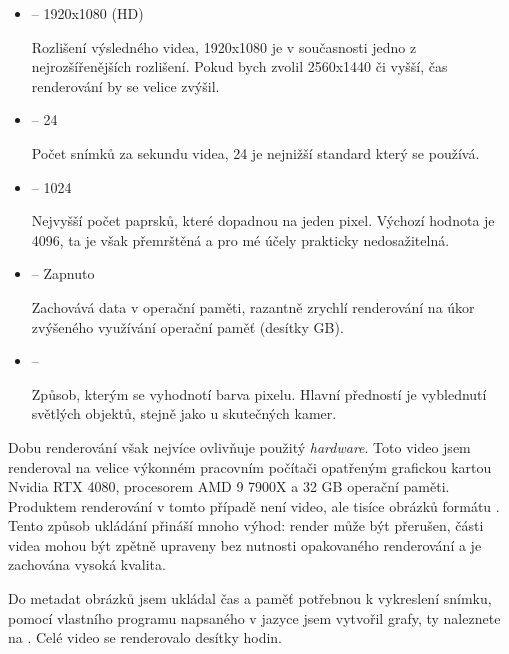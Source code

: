 \begin{itemize}
    \item { -- 1920x1080 (HD)}\par
        {Rozlišení výsledného videa, 1920x1080 je v současnosti jedno z nejrozšířenějších rozlišení. Pokud bych zvolil 2560x1440 či vyšší, čas renderování by se velice zvýšil.}
    \item { -- 24}\par
        {Počet snímků za sekundu videa, 24 je nejnižší standard který se používá.}
    \item { -- 1024}\par
        {Nejvyšší počet paprsků, které dopadnou na jeden pixel. Výchozí hodnota je 4096, ta je však přemrštěná a pro mé účely prakticky nedosažitelná.}
    \item { -- Zapnuto}\par
        {Zachovává data v operační paměti, razantně zrychlí renderování na úkor zvýšeného využívání operační paměť (desítky GB).}
    \item { -- }\par
        {Způsob, kterým se vyhodnotí barva pixelu. Hlavní předností  je vyblednutí světlých objektů, stejně jako u skutečných kamer.}
\end{itemize}

{Dobu renderování však nejvíce ovlivňuje použitý \textit{hardware}. Toto video jsem renderoval na velice výkonném pracovním počítači opatřeným grafickou kartou Nvidia RTX 4080, procesorem AMD 9 7900X a 32 GB operační paměti.}\odst
{Produktem renderování v tomto případě není video, ale tisíce obrázků formátu . Tento způsob ukládání přináší mnoho výhod: render může být přerušen, části videa mohou být zpětně upraveny bez nutnosti opakovaného renderování a je zachována vysoká kvalita.}

\newpage

{Do metadat obrázků jsem ukládal čas a paměť potřebnou k vykreslení snímku, pomocí vlastního programu napsaného v jazyce  jsem vytvořil grafy, ty naleznete na . Celé video se renderovalo desítky hodin.}


